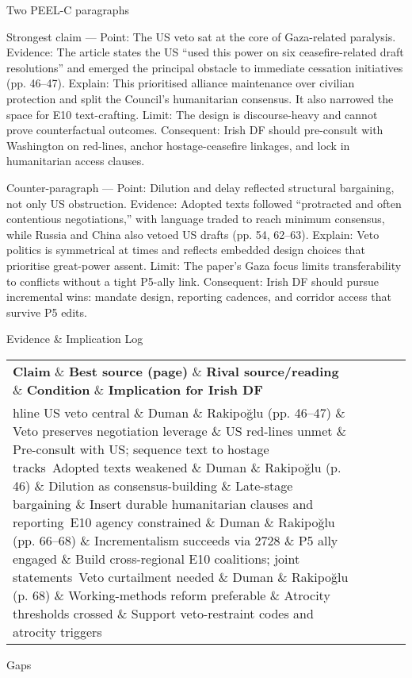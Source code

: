 Two PEEL-C paragraphs

Strongest claim — Point: The US veto sat at the core of Gaza-related paralysis.
Evidence: The article states the US “used this power on six ceasefire-related draft resolutions” and emerged the principal obstacle to immediate cessation initiatives (pp. 46–47).
Explain: This prioritised alliance maintenance over civilian protection and split the Council’s humanitarian consensus. It also narrowed the space for E10 text-crafting.
Limit: The design is discourse-heavy and cannot prove counterfactual outcomes.
Consequent: Irish DF should pre-consult with Washington on red-lines, anchor hostage-ceasefire linkages, and lock in humanitarian access clauses.

Counter-paragraph — Point: Dilution and delay reflected structural bargaining, not only US obstruction.
Evidence: Adopted texts followed “protracted and often contentious negotiations,” with language traded to reach minimum consensus, while Russia and China also vetoed US drafts (pp. 54, 62–63).
Explain: Veto politics is symmetrical at times and reflects embedded design choices that prioritise great-power assent.
Limit: The paper’s Gaza focus limits transferability to conflicts without a tight P5-ally link.
Consequent: Irish DF should pursue incremental wins: mandate design, reporting cadences, and corridor access that survive P5 edits.

Evidence \& Implication Log

\begin{tabular}{p{3.2cm}p{4.2cm}p{3.6cm}p{3.2cm}p{4.2cm}}
	\textbf{Claim} \& \textbf{Best source (page)} \& \textbf{Rival source/reading} \& \textbf{Condition} \& \textbf{Implication for Irish DF}\\hline
	US veto central \& Duman \& Rakipoğlu (pp. 46–47) \& Veto preserves negotiation leverage \& US red-lines unmet \& Pre-consult with US; sequence text to hostage tracks\
	Adopted texts weakened \& Duman \& Rakipoğlu (p. 46) \& Dilution as consensus-building \& Late-stage bargaining \& Insert durable humanitarian clauses and reporting\
	E10 agency constrained \& Duman \& Rakipoğlu (pp. 66–68) \& Incrementalism succeeds via 2728 \& P5 ally engaged \& Build cross-regional E10 coalitions; joint statements\
	Veto curtailment needed \& Duman \& Rakipoğlu (p. 68) \& Working-methods reform preferable \& Atrocity thresholds crossed \& Support veto-restraint codes and atrocity triggers\
\end{tabular}

Gaps


